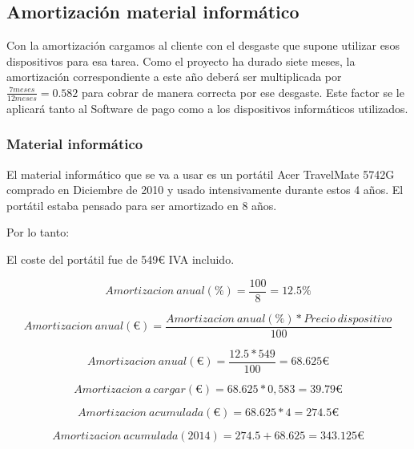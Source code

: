 \subsection{Amortizaci\'on material inform\'atico}
Con la amortizaci\'on cargamos al cliente con el desgaste que supone utilizar esos
dispositivos para esa tarea. Como el proyecto ha durado siete meses, la amortizaci\'on
correspondiente a este a\~no deber\'a ser multiplicada por $ \frac{7 meses}{12 meses} = 0.582 $ 
para cobrar de manera correcta por ese desgaste. Este factor se le aplicar\'a tanto al Software de pago como
a los dispositivos inform\'aticos utilizados.

\subsubsection{Material inform\'{a}tico}
El material informático que se va a usar es un portátil Acer TravelMate 5742G comprado en 
Diciembre de 2010 y usado intensivamente durante estos 4 años. 
El portátil estaba pensado para ser amortizado en 8 años.

Por lo tanto:

El coste del port\'atil fue de 549€ IVA incluido.
\begin{center}
\begin{equation}
Amortizacion \ anual (\%) = \frac{100}{8} = 12.5 \%
\end{equation}

\begin{equation}
Amortizacion \ anual (€) = \frac{Amortizacion \ anual(\%) * Precio \ dispositivo}{100}
\end{equation}

\begin{equation}
Amortizacion \ anual (€) = \frac{12.5 * 549}{100} = 68.625 €
\end{equation}

\begin{equation}
Amortizacion \ a \ cargar (€) = 68.625 * 0,583 = 39.79 €
\end{equation}


\begin{equation}
Amortizacion \ acumulada (€) = 68.625 * 4 = 274.5 €
\end{equation}

\begin{equation}
Amortizacion \ acumulada (2014) = 274.5 + 68.625 = 343.125 €
\end{equation}

\end{center}

